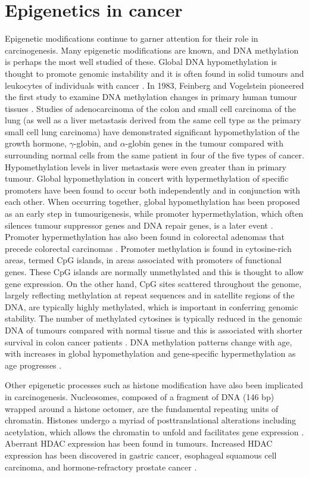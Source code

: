 \section[]{Epigenetics in cancer} %
\noindent Epigenetic modifications continue to garner attention for their role in carcinogenesis. Many epigenetic modifications are known, and DNA methylation is perhaps the most well studied of these. Global DNA hypomethylation is thought to promote genomic instability and it is often found in solid tumours \cite{c215} and leukocytes of individuals with cancer \cite{c216,c217}. In 1983, Feinberg and Vogelstein pioneered the first study to examine DNA methylation changes in primary human tumour tissues \cite{c215}. Studies of adenocarcinoma of the colon and small cell carcinoma of the lung (as well as a liver metastasis derived from the same cell type as the primary small cell lung carcinoma) have demonstrated significant hypomethylation of the growth hormone, $\gamma$-globin, and $\alpha$-globin genes in the tumour compared with surrounding normal cells from the same patient in four of the five types of cancer. Hypomethylation levels in liver metastasis were even greater than in primary tumour. Global 
hypomethylation in concert with hypermethylation of specific promoters have been found to occur both independently and in conjunction with each other. When occurring together, global hypomethylation has been proposed as an early step in tumourigenesis, while promoter hypermethylation, which often silences tumour suppressor genes and DNA repair genes, is a later event \cite{c218}. Promoter hypermethylation has also been found in colorectal adenomas that precede colorectal carcinomas \cite{c219}. Promoter methylation is found in cytosine-rich areas, termed CpG islands, in areas associated with promoters of functional genes. These CpG islands are normally unmethylated and this is thought to allow gene expression. On the other hand, CpG sites scattered throughout the genome, largely reflecting methylation at repeat sequences and in satellite regions of the DNA, are typically highly methylated, which is important in conferring genomic stability. The number of methylated cytosines is typically reduced in the 
genomic DNA of tumours compared with normal tissue \cite{c220} and this is associated with shorter survival in colon cancer patients \cite{c221}. DNA methylation patterns change with age, with increases in global hypomethylation and gene-specific hypermethylation as age progresses \cite{c222,c223}.

\noindent Other epigenetic processes such as histone modification have also been implicated in carcinogenesis. Nucleosomes, composed of a fragment of DNA (146 bp) wrapped around a histone octomer, are the fundamental repeating units of chromatin. Histones undergo a myriad of posttranslational alterations including acetylation, which allows the chromatin to unfold and facilitates gene expression \cite{c224}. Aberrant HDAC expression has been found in tumours. Increased HDAC expression has been discovered in gastric cancer, esophageal squamous cell carcinoma, and hormone-refractory prostate cancer \cite{c225,c226}.

